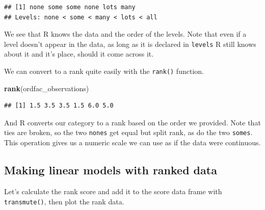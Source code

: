 \documentclass[
]{book}
\newenvironment{Shaded}{\begin{snugshade}}{\end{snugshade}}
\newcommand{\DataTypeTok}[1]{\textcolor[rgb]{0.13,0.29,0.53}{#1}}
\newcommand{\KeywordTok}[1]{\textcolor[rgb]{0.13,0.29,0.53}{\textbf{#1}}}
\newcommand{\NormalTok}[1]{#1}
\newcommand{\OperatorTok}[1]{\textcolor[rgb]{0.81,0.36,0.00}{\textbf{#1}}}
\newcommand{\OtherTok}[1]{\textcolor[rgb]{0.56,0.35,0.01}{#1}}
\newcommand{\StringTok}[1]{\textcolor[rgb]{0.31,0.60,0.02}{#1}}
\begin{document}
\begin{verbatim}
## [1] none some some none lots many
## Levels: none < some < many < lots < all
\end{verbatim}

We see that R knows the data and the order of the levels. Note that even if a level doesn't appear in the data, as long as it is declared in \texttt{levels} R still knows about it and it's place, should it come across it.

We can convert to a rank quite easily with the \texttt{rank()} function.

\begin{Shaded}
\begin{Highlighting}[]
\KeywordTok{rank}\NormalTok{(ordfac_observations)}
\end{Highlighting}
\end{Shaded}

\begin{verbatim}
## [1] 1.5 3.5 3.5 1.5 6.0 5.0
\end{verbatim}

And R converts our category to a rank based on the order we provided. Note that ties are broken, so the two \texttt{nones} get equal but split rank, as do the two \texttt{somes}. This operation gives us a numeric scale we can use as if the data were continuous.

\hypertarget{making-linear-models-with-ranked-data}{%
\subsection{Making linear models with ranked data}\label{making-linear-models-with-ranked-data}}

Let's calculate the rank score and add it to the score data frame with \texttt{transmute()}, then plot the rank data.

\begin{Shaded}
\end{Shaded}
\end{document}

